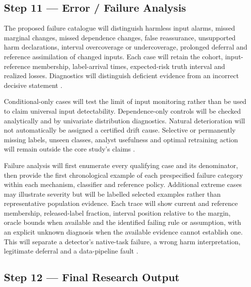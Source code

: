 \subsection*{Step 11 --- Error / Failure Analysis}
The proposed failure catalogue will distinguish harmless input alarms, missed marginal changes, missed dependence changes, false reassurance, unsupported harm declarations, interval overcoverage or undercoverage, prolonged deferral and reference assimilation of changed inputs. Each case will retain the cohort, input-reference membership, label-arrival times, expected-risk truth interval and realized losses. Diagnostics will distinguish deficient evidence from an incorrect decisive statement \cite{greco,szucs,souza,alencar}.

Conditional-only cases will test the limit of input monitoring rather than be used to claim universal input detectability. Dependence-only controls will be checked analytically and by univariate distribution diagnostics. Natural deterioration will not automatically be assigned a certified drift cause. Selective or permanently missing labels, unseen classes, analyst usefulness and optimal retraining action will remain outside the core study's claims \cite{driftvis,souza,alencar}.

Failure analysis will first enumerate every qualifying case and its denominator, then provide the first chronological example of each prespecified failure category within each mechanism, classifier and reference policy. Additional extreme cases may illustrate severity but will be labelled selected examples rather than representative population evidence. Each trace will show current and reference membership, released-label fraction, interval position relative to the margin, oracle bounds when available and the identified failing rule or assumption, with an explicit unknown diagnosis when the available evidence cannot establish one. This will separate a detector's native-task failure, a wrong harm interpretation, legitimate deferral and a data-pipeline fault \cite{souza,window,nist}.

\subsection*{Step 12 --- Final Research Output}

